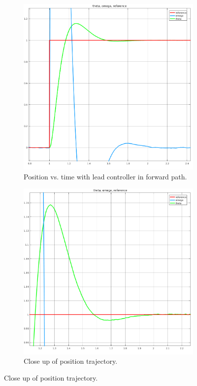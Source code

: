 \documentclass[11pt,a4paper]{article}
\begin{document}
\begin{figure}[!htbp]
	\centering
	\begin{subfigure}{.5\textwidth}
		\centering
		\includegraphics[width = \textwidth]{imglab/lab4sol_leadtrajforward.png}
		\caption{Position vs. time with lead controller in forward path.}
	\end{subfigure}%
	\begin{subfigure}{.5\textwidth}
		\centering
		\includegraphics[width = \textwidth]{imglab/lab4sol_leadtrajforwardclose.png}
		\caption{Close up of position trajectory.}	
	\end{subfigure}
\end{figure}
\end{document}
